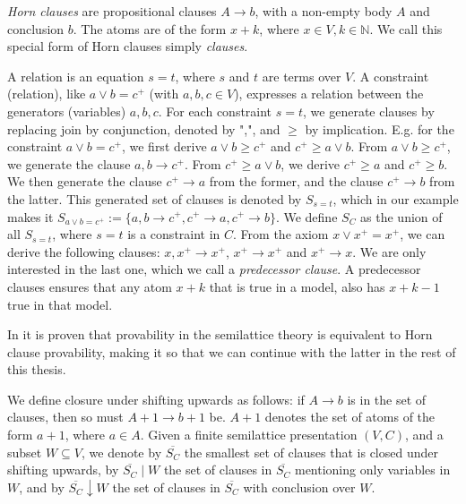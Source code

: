 \emph{Horn clauses} are propositional clauses $A \rightarrow b$, with a non-empty body $A$ and conclusion $b$.
The atoms are of the form $x + k$, where $x \in V, k \in \mathbb{N}$.
We call this special form of Horn clauses simply \emph{clauses}.

A relation is an equation $s = t$, where $s$ and $t$ are terms over $V$.
A constraint (relation), like $a \lor b = c^+$ (with $a, b, c \in V$), expresses a relation between the generators (variables) $a, b, c$.
For each constraint $s = t$, we generate clauses by replacing join by conjunction, denoted by ",", and $\geq$ by implication.
E.g. for the constraint $a \lor b = c^+$, we first derive $a \lor b \geq c^+$ and $c^+ \geq a \lor b$.
From $a \lor b \geq c^+$, we generate the clause $a, b \rightarrow c^+$.
From $c^+ \geq a \lor b$, we derive $c^+ \geq a$ and $c^+ \geq b$.
We then generate the clause $c^+ \rightarrow a$ from the former, and the clause $c^+ \rightarrow b$ from the latter.
This generated set of clauses is denoted by $S_{s=t}$, which in our example makes it
$S_{a \lor b = c^+} := \{a, b \rightarrow c^+, c^+ \rightarrow a, c^+ \rightarrow b\}$.
We define $S_C$ as the union of all $S_{s=t}$, where $s = t$ is a constraint in $C$.
From the axiom $x \lor x^+ = x^+$, we can derive the following clauses:
$x, x^+ \rightarrow x^+$,
$x^+ \rightarrow x^+$ and $x^+ \rightarrow x$.
We are only interested in the last one, which we call a \emph{predecessor clause}.
A predecessor clauses ensures that any atom $x + k$ that is true in a model,
also has $x + k - 1$ true in that model.


In \cite[Theorem 2.2,~p.~3]{mbezem} it is proven that provability in the semilattice theory
is equivalent to Horn clause provability, making it so that we can continue with the latter in the rest of this thesis.

We define closure under shifting upwards as follows:
if $A \rightarrow b$ is in the set of clauses, then so must $A + 1 \rightarrow b + 1$ be.
$A + 1$ denotes the set of atoms of the form $a + 1$, where $a \in A$.
Given a finite semilattice presentation $(V, C)$,
and a subset $W \subseteq V$, we denote by
$\overline{S_C}$ the smallest set of clauses that is closed under shifting upwards,
by $\overline{S_C} \mid W$ the set of clauses in $\overline{S_C}$
mentioning only variables in $W$, and by $\overline{S_C} \downarrow W$
the set of clauses in $\overline{S_C}$ with conclusion over $W$.

